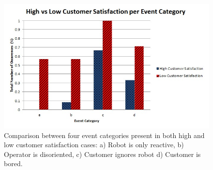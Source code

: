 \documentclass[journal]{IEEEtran}
\begin{document}
\begin{figure}[htb]
\centering
\includegraphics[width=1\columnwidth, scale=0.6]{figs/highVsLowCustomerSatisfaction3}
\caption{Comparison between four event categories present in both high and low customer satisfaction cases: a) Robot is only reactive, b) Operator is disoriented, c) Customer ignores robot d) Customer is bored.}
\label{fig:highVsLow}
\end{figure}
\end{document}
